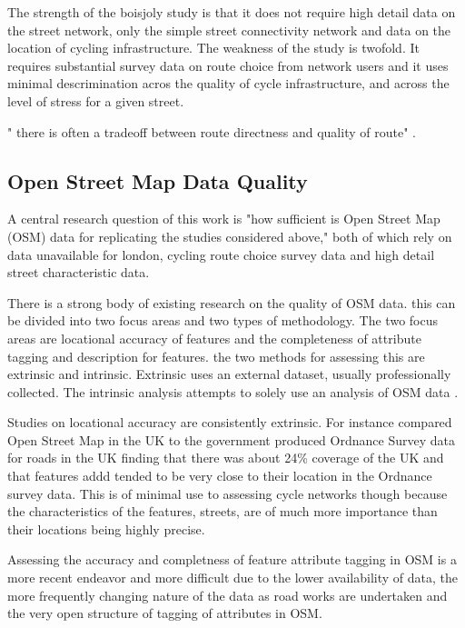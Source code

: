 The strength of the boisjoly study is that it does not require high detail data on the street network, only the simple street connectivity network and data on the location of cycling infrastructure. The weakness of the study is twofold. It requires substantial survey data on route choice from network users and it uses minimal descrimination acros the quality of cycle infrastructure, and across the level of stress for a given street. 

" there is often a tradeoff between route directness and quality of route" \cite{boisjoly2019bicycle}. 

\subsection{Open Street Map Data Quality}

A central research question of this work is "how sufficient is Open Street Map (OSM) data for replicating the studies considered above," both of which rely on data unavailable for london, cycling route choice survey data and high detail street characteristic data. 

There is a strong body of existing research on the quality of OSM data. this can be divided into two focus areas and two types of methodology. The two focus areas are locational accuracy of features and the completeness of attribute tagging and description for features. the two methods for assessing this are extrinsic and intrinsic. Extrinsic uses an external dataset, usually professionally collected. The intrinsic analysis attempts to solely use an analysis of OSM data . 

Studies on locational accuracy are consistently extrinsic. For instance \cite{hakley2010good} compared Open Street Map in the UK to the government produced Ordnance Survey data for roads in the UK finding that there was about 24\% coverage of the UK and that features addd tended to be very close to their location in the Ordnance survey data. This is of minimal use to assessing cycle networks though because the characteristics of the features, streets, are of much more importance than their locations being highly precise. 

Assessing the accuracy and completness of feature attribute tagging in OSM is a more recent endeavor and more difficult due to the lower availability of data, the more frequently changing nature of the data as road works are undertaken and the very open structure of tagging of attributes in OSM.  

